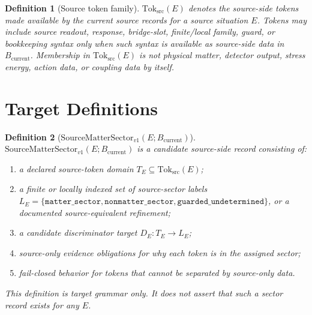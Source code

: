 \documentclass[11pt]{article}
\newcommand{\Bcur}{B_{\mathrm{current}}}
\newcommand{\Tokens}{\mathrm{Tok}_{\mathrm{src}}}
\newcommand{\MatterSector}{\mathrm{SourceMatterSector}_{v1}}
\newtheorem{definition}{Definition}
\begin{document}
\begin{definition}[Source token family]
\(\Tokens(E)\) denotes the source-side tokens made available by the current
source records for a source situation \(E\). Tokens may include source
readout, response, bridge-slot, finite/local family, guard, or bookkeeping
syntax only when such syntax is available as source-side data in \(\Bcur\).
Membership in \(\Tokens(E)\) is not physical matter, detector output, stress
energy, action data, or coupling data by itself.
\end{definition}

\section{Target Definitions}

\begin{definition}[\(\MatterSector(E;\Bcur)\)]
\(\MatterSector(E;\Bcur)\) is a candidate source-side record consisting of:
\begin{enumerate}[leftmargin=*]
\item a declared source-token domain \(T_E \subseteq \Tokens(E)\);
\item a finite or locally indexed set of source-sector labels
  \(L_E = \{\mathtt{matter\_sector}, \mathtt{nonmatter\_sector},
  \mathtt{guarded\_undetermined}\}\), or a documented source-equivalent
  refinement;
\item a candidate discriminator target \(D_E:T_E\to L_E\);
\item source-only evidence obligations for why each token is in the assigned
  sector;
\item fail-closed behavior for tokens that cannot be separated by source-only
  data.
\end{enumerate}

This definition is target grammar only. It does not assert that such a sector
record exists for any \(E\).
\end{definition}
\end{document}
